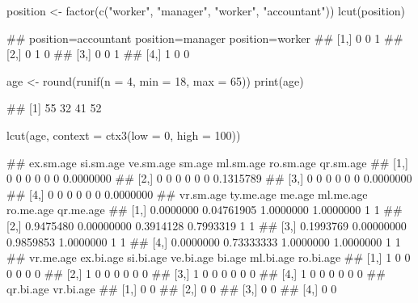 \documentclass{article}\usepackage[]{graphicx}\usepackage[]{color}
\begin{document}
\begin{Schunk}
% --begin: "lcut.factor"
\begin{Sinput}
position <- factor(c("worker", "manager", "worker", "accountant"))
lcut(position)
\end{Sinput}
\begin{Soutput}
##      position=accountant position=manager position=worker
## [1,]                   0                0               1
## [2,]                   0                1               0
## [3,]                   0                0               1
## [4,]                   1                0               0
\end{Soutput}
%
% --end: "lcut.factor"
\end{Schunk}

\begin{Schunk}
% --begin: "lcut.numeric"
\begin{Sinput}
age <- round(runif(n = 4, min = 18, max = 65))
print(age)
\end{Sinput}
\begin{Soutput}
## [1] 55 32 41 52
\end{Soutput}
\begin{Sinput}
lcut(age, context = ctx3(low = 0, high = 100))
\end{Sinput}
\begin{Soutput}
##      ex.sm.age si.sm.age ve.sm.age sm.age ml.sm.age ro.sm.age qr.sm.age
## [1,]         0         0         0      0         0         0 0.0000000
## [2,]         0         0         0      0         0         0 0.1315789
## [3,]         0         0         0      0         0         0 0.0000000
## [4,]         0         0         0      0         0         0 0.0000000
##      vr.sm.age  ty.me.age    me.age ml.me.age ro.me.age qr.me.age
## [1,] 0.0000000 0.04761905 1.0000000 1.0000000         1         1
## [2,] 0.9475480 0.00000000 0.3914128 0.7993319         1         1
## [3,] 0.1993769 0.00000000 0.9859853 1.0000000         1         1
## [4,] 0.0000000 0.73333333 1.0000000 1.0000000         1         1
##      vr.me.age ex.bi.age si.bi.age ve.bi.age bi.age ml.bi.age ro.bi.age
## [1,]         1         0         0         0      0         0         0
## [2,]         1         0         0         0      0         0         0
## [3,]         1         0         0         0      0         0         0
## [4,]         1         0         0         0      0         0         0
##      qr.bi.age vr.bi.age
## [1,]         0         0
## [2,]         0         0
## [3,]         0         0
## [4,]         0         0
\end{Soutput}
%
% --end: "lcut.numeric"
\end{Schunk}
\end{document}
